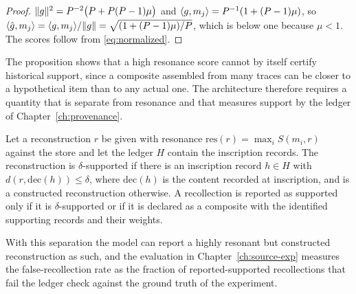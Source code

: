 \begin{proof}
$\lVert g\rVert^2=P^{-2}\bigl(P+P(P-1)\mu\bigr)$ and $\langle g,m_j\rangle=P^{-1}(1+(P-1)\mu)$, so $\langle \hat g,m_j\rangle=\langle g,m_j\rangle/\lVert g\rVert=\sqrt{(1+(P-1)\mu)/P}$, which is below one because $\mu<1$. The scores follow from \eqref{eq:normalized}.
\end{proof}

The proposition shows that a high resonance score cannot by itself certify historical support, since a composite assembled from many traces can be closer to a hypothetical item than to any actual one. The architecture therefore requires a quantity that is separate from resonance and that measures support by the ledger of Chapter~\ref{ch:provenance}.

\begin{definition}\label{def:support}
Let a reconstruction $r$ be given with resonance $\mathrm{res}(r)=\max_iS(m_i,r)$ against the store and let the ledger $H$ contain the inscription records. The reconstruction is $\delta$-supported if there is an inscription record $h\in H$ with $d(r,\mathrm{dec}(h))\le\delta$, where $\mathrm{dec}(h)$ is the content recorded at inscription, and is a constructed reconstruction otherwise. A recollection is reported as supported only if it is $\delta$-supported or if it is declared as a composite with the identified supporting records and their weights.
\end{definition}

With this separation the model can report a highly resonant but constructed reconstruction as such, and the evaluation in Chapter~\ref{ch:source-exp} measures the false-recollection rate as the fraction of reported-supported recollections that fail the ledger check against the ground truth of the experiment.
